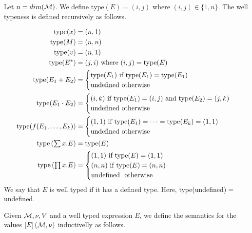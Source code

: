 Let $n=dim(\mathcal{M})$. We define $\text{type}(E)=(i,j)$ where $(i,j)\in \lbrace 1, n\rbrace$. The well typeness is defined recursively as follows.

\begin{align*}
\text{type}(x) &= (n,1) \\
\text{type}(M) &= (n,n) \\
\text{type}(v) &= (n,1) \\
\text{type}(E^*)&=(j,i) \text{ where } (i,j)=\text{type}(E) \\
\text{type}(E_1 + E_2) &= \begin{cases}
               \text{type}(E_1) \text{ if } \text{type}(E_1)=\text{type}(E_1) \\
               \text{undefined} \text{ otherwise }
            \end{cases} \\
\text{type}(E_1\cdot E_2)&=\begin{cases}
               (i,k) \text{ if } \text{type}(E_1)=(i,j)\text{ and type}(E_2)=(j,k) \\
               \text{undefined} \text{ otherwise }
            \end{cases} \\
\text{type}(f(E_1,\ldots, E_k))&=\begin{cases}
               (1,1) \text{ if } \text{type}(E_1)=\cdots =\text{type}(E_k)=(1,1) \\
               \text{undefined} \text{ otherwise }
            \end{cases} \\
\text{type}\left(\textstyle\sum x.E\right) &= \text{type}(E) \\
\text{type}\left(\textstyle\prod x. E\right) &=
\begin{cases}
               (1,1) \text{ if } \text{type}(E)=(1,1) \\
               (n,n) \text{ if } \text{type}(E)=(n,n) \\
               \text{undefined } \text{ otherwise }
            \end{cases}
\end{align*}
We say that $E$ is well typed if it has a defined type. Here, type(undefined)$=$ undefined.


Given $\mathcal{M}, \nu, V$ and a well typed expression $E$, we define the semantics for the values $\left[ E\right](\mathcal{M},\nu)$ inductivelly as follows.


